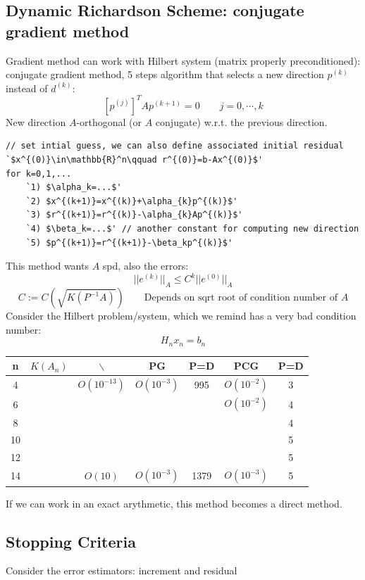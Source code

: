 \subsection{Dynamic Richardson Scheme: conjugate gradient method}
    Gradient method can work with Hilbert system (matrix properly preconditioned): conjugate gradient method, 5 steps algorithm that selects a new direction $p^{(k)}$ instead of $d^{(k)}$:
    $$
    \left[p^{(j)}\right]^TAp^{(k+1)}=0
    \qquad j = 0,\cdots,k
    $$
    New direction $A$-orthogonal (or $A$ conjugate) w.r.t. the previous direction.
    \begin{center}
        \begin{lstlisting}[escapeinside=`']
// set intial guess, we can also define associated initial residual
`$x^{(0)}\in\mathbb{R}^n\qquad r^{(0)}=b-Ax^{(0)}$'
for k=0,1,...
    `1) $\alpha_k=...$'
    `2) $x^{(k+1)}=x^{(k)}+\alpha_{k}p^{(k)}$'
    `3) $r^{(k+1)}=r^{(k)}-\alpha_{k}Ap^{(k)}$'
    `4) $\beta_k=...$' // another constant for computing new direction
    `5) $p^{(k+1)}=r^{(k+1)}-\beta_kp^{(k)}$'
        \end{lstlisting}
    \end{center}
    This method wants $A$ spd, also the errors:
    $$
    ||e^{(k)}||_A\leq
    C^k||e^{(0)}||_A
    $$
    $$
    C:=C\left(\sqrt{K(P^{-1}A)}\right)\qquad\text{Depends on sqrt root of condition number of $A$}
    $$
    Consider the Hilbert problem/system, which we remind has a very bad condition number:
    $$
    H_nx_n=b_n
    $$
    \begin{center}        
        \begin{tabular}{c|c|c|c c|c c}
            \textbf{n} & $K(A_n)$ & $\backslash$ & PG & P=D & PCG & P=D\\ \midrule
            4 & & $O(10^{-13})$ & $O(10^{-3})$ & 995 & $O(10^{-2})$ & 3\\ \hline
            6  & &  & & & $O(10^{-2})$ & 4\\ \hline
            8  & &  & & & & 4\\ \hline
            10 & &  & & & & 5\\ \hline
            12 & &  & & & & 5\\ \hline
            14 & & $O(10)$ & $O(10^{-3})$ & 1379 & $O(10^{-3})$ & 5
        \end{tabular}
    \end{center}
    If we can work in an exact arythmetic, this method becomes a direct method.

    \subsection{Stopping Criteria}
    Consider the error estimators: increment and residual
